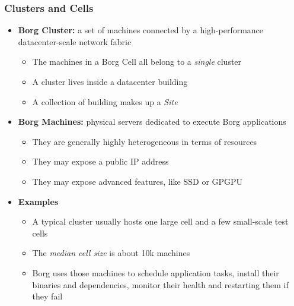 \begin{frame}
\frametitle{Clusters and Cells}
\begin{itemize}
	\item {\bf Borg Cluster:} a set of machines connected by a high-performance datacenter-scale network fabric
	\begin{itemize}
		\item The machines in a Borg Cell all belong to a {\it single} cluster
		\item A cluster lives inside a datacenter building
		\item A collection of building makes up a {\it Site}
	\end{itemize}
	\item {\bf Borg Machines:} physical servers dedicated to execute Borg applications
	\begin{itemize}
		\item They are generally highly heterogeneous in terms of resources
		\item They may expose a public IP address
		\item They may expose advanced features, like SSD or GPGPU
	\end{itemize}
	\item {\bf Examples}
	\begin{itemize}
		\item A typical cluster usually hosts one large cell and a few small-scale test cells
		\item The {\it median cell size} is about 10k machines
		\item Borg uses those machines to schedule application tasks, install their binaries and dependencies, monitor their health and restarting them if they fail
	\end{itemize}
\end{itemize}
\end{frame}

